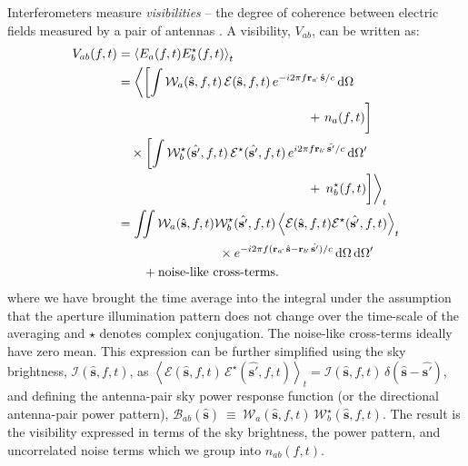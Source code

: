 \documentclass[a4paper,fleqn,usenatbib]{mnras}
\newcommand{\dif}{\mathrm{d}}
\begin{document}
Interferometers measure {\it visibilities} -- the degree of coherence between electric fields measured by a pair of antennas \citep{van34,zer38,tho01}. A visibility, $V_{ab}$, can be written as:
\begin{align}
  V_{ab}(f,t) &= \left\langle E_a(f,t)E_b^\star(f,t) \right\rangle_t \label{eqn:cc-vis}\hfill\\
              &= \left\langle \left[ \int \mathcal{W}_a(\hat{\mathbf{s}},f,t)\,\mathcal{E}(\hat{\mathbf{s}},f,t)\,e^{-i 2\pi f\mathbf{r}_a\!\cdot\,\hat{\mathbf{s}}/c}\,\dif\Omega\right.\right. \nonumber\\
              &\qquad\qquad\qquad\qquad\qquad\qquad\qquad\quad + \left. n_a(f,t) \vphantom{\int}\right] \nonumber\\
              &\quad \times \left[ \int \mathcal{W}^\star_b(\hat{\mathbf{s'}},f,t)\,\mathcal{E}^\star (\hat{\mathbf{s'}},f,t)\,e^{i 2\pi f\mathbf{r}_b\!\cdot\,\hat{\mathbf{s'}}/c}\,\dif\Omega^\prime \right. \nonumber\\
              &\qquad\qquad\qquad\qquad\qquad\qquad\qquad\quad + \left.\left. n^\star_b(f,t) \vphantom{\int}\right] \right\rangle_t \nonumber\\
              &= \iint \mathcal{W}_a(\hat{\mathbf{s}},f,t) \mathcal{W}^\star_b(\hat{\mathbf{s'}},f,t) \left\langle \mathcal{E}(\hat{\mathbf{s}},f,t) \mathcal{E}^\star(\hat{\mathbf{s'}},f,t) \right\rangle_t \nonumber\\
              &\qquad\qquad\qquad\qquad \times e^{-i 2\pi f(\mathbf{r}_a\!\cdot\,\hat{\mathbf{s}}-\mathbf{r}_b\!\cdot\,\hat{\mathbf{s'}})/c}\,\dif\Omega\,\dif\Omega^\prime \nonumber\\
              &\qquad +\textrm{noise-like cross-terms.}
\end{align}
where we have brought the time average into the integral under the assumption that the aperture illumination pattern does not change over the time-scale of the averaging and $\star$ denotes complex conjugation. The noise-like cross-terms ideally have zero mean. This expression can be further simplified using the sky brightness, $\mathcal{I}(\hat{\mathbf{s}},f,t)$, as $\left\langle \mathcal{E}(\hat{\mathbf{s}},f,t)\,\mathcal{E}^\star(\hat{\mathbf{s'}},f,t) \right\rangle_t = \mathcal{I}(\hat{\mathbf{s}},f,t)\,\delta(\hat{\mathbf{s}}-\hat{\mathbf{s'}})$, and defining the antenna-pair sky power response function (or the directional antenna-pair power pattern), $\mathcal{B}_{ab}(\hat{\mathbf{s}})~\equiv~\mathcal{W}_a(\hat{\mathbf{s}},f,t)~\mathcal{W}^\star_b(\hat{\mathbf{s}},f,t)$. The result is the visibility expressed in terms of the sky brightness, the power pattern, and uncorrelated noise terms which we group into $n_{ab}(f,t)$.
\end{document}
